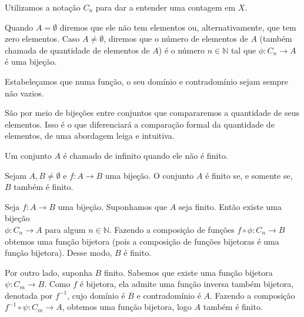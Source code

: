 \documentclass[../main.tex]{subfiles}
\begin{document}
Utilizamos a notação $C_n$ para dar a entender uma contagem em $X$.

Quando $A = \emptyset$ diremos que ele não tem elementos ou, alternativamente, que tem zero elementos. Caso $A \neq \emptyset$, diremos que o número de elementos de $A$ (também chamada de quantidade de elementos de $A$) é o número $n \in \mathbb{N}$ tal que $\phi \colon C_n \to A$ é uma bijeção.

Estabeleçamos que numa função, o seu domínio e contradomínio sejam sempre não vazios.

São por meio de bijeções entre conjuntos que compararemos a quantidade de seus elementos. Isso é o que diferenciará a comparação formal da quantidade de elementos, de uma abordagem leiga e intuitiva.

\begin{defi}\label{enum-def-conjuntoInfinito}
    Um conjunto $A$ é chamado de infinito quando ele não é finito.
\end{defi}
\begin{teo}
    Sejam $A,B \neq \emptyset$ e $f \colon A \to B$ uma bijeção. O conjunto $A$ é finito se, e somente se, $B$ também é finito.
\end{teo}
\begin{dem}
    Seja $f \colon A \to B$ uma bijeção. Suponhamos que $A$ seja finito. Então existe uma bijeção \\ 
    $\phi \colon C_n \to A$ para algum $n \in \mathbb{N}$. Fazendo a composição de funções
    $f \circ \phi \colon C_n \to B$ obtemos uma função bijetora (pois a composição de funções bijetoras é uma função bijetora). Desse modo, $B$ é finito.

    Por outro lado, suponha $B$ finito. Sabemos que existe uma função bijetora ${\psi \colon C_m \to B}$. Como $f$ é bijetora, ela admite uma função inversa também bijetora, denotada por $f^{-1}$, cujo domínio é $B$ e contradomínio é $A$. Fazendo a composição $f^{-1} \circ \psi \colon C_m \to A$, obtemos uma função bijetora, logo $A$ também é finito. 
\end{dem}
\end{document}
